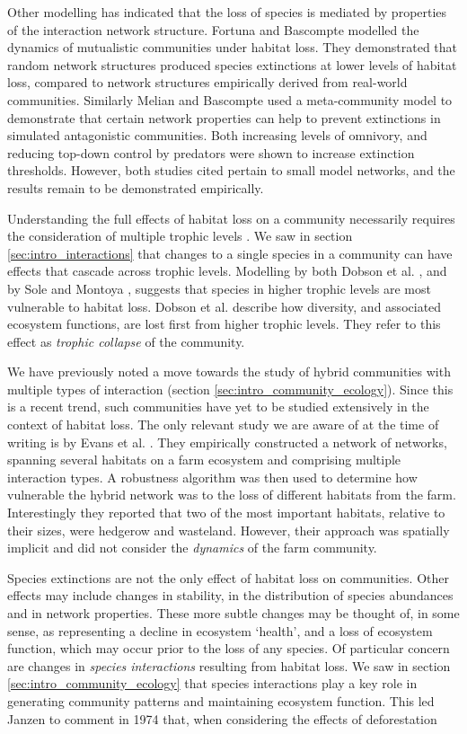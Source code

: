 Other modelling has indicated that the loss of species is mediated by properties of the interaction network structure. Fortuna and Bascompte \cite{fortuna2006habitat} modelled the dynamics of mutualistic communities under habitat loss. They demonstrated that random network structures produced species extinctions at lower levels of habitat loss, compared to network structures empirically derived from real-world communities. Similarly Melian and Bascompte \cite{melian2002food} used a meta-community model to demonstrate that certain network properties can help to prevent extinctions in simulated antagonistic communities. Both increasing levels of omnivory, and reducing top-down control by predators were shown to increase extinction thresholds. However, both studies cited pertain to small model networks, and the results remain to be demonstrated empirically.     

Understanding the full effects of habitat loss on a community necessarily requires the consideration of multiple trophic levels \cite{dobson2006habitat,sole2006ecological}. We saw in section \ref{sec:intro_interactions} that changes to a single species in a community can have effects that cascade across trophic levels. Modelling by both Dobson et al. \cite{dobson2006habitat}, and by Sole and Montoya \cite{sole2006ecological}, suggests that species in higher trophic levels are most vulnerable to habitat loss. Dobson et al. describe how diversity, and associated ecosystem functions, are lost first from higher trophic levels. They refer to this effect as \emph{trophic collapse} of the community.

We have previously noted a move towards the study of hybrid communities with multiple types of interaction (section \ref{sec:intro_community_ecology}). Since this is a recent trend, such communities have yet to be studied extensively in the context of habitat loss. The only relevant study we are aware of at the time of writing is by Evans et al. \cite{evans2013robustness}. They empirically constructed a network of networks, spanning several habitats on a farm ecosystem and comprising multiple interaction types. A robustness algorithm was then used to determine how vulnerable the hybrid network was to the loss of different habitats from the farm. Interestingly they reported that two of the most important habitats, relative to their sizes, were hedgerow and wasteland. However, their approach was spatially implicit and did not consider the \emph{dynamics} of the farm community. 

Species extinctions are not the only effect of habitat loss on communities. Other effects may include changes in stability, in the distribution of species abundances and in network properties. These more subtle changes may be thought of, in some sense, as representing a decline in ecosystem `health', and a loss of ecosystem function, which may occur prior to the loss of any species. Of particular concern are changes in \emph{species interactions} resulting from habitat loss. We saw in section \ref{sec:intro_community_ecology} that species interactions play a key role in generating community patterns and maintaining ecosystem function. This led Janzen to comment in 1974 that, when considering the effects of deforestation

